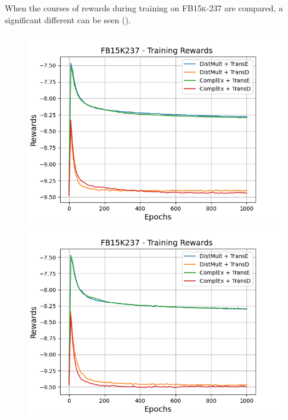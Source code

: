 When the courses of rewards during training on \textsc{FB15k-237} are compared, a significant different can be seen ().
\begin{figure}[H]
    \centering
    \begin{minipage}{.5\textwidth}
      \centering
      \includegraphics[width=0.9\linewidth]{figures/results/gan_train/not_pretrained/uncertainty/max_distribution/entropy/fb15k237/1k_epochs/uncertainty_fb15k237_rew.png}
    \end{minipage}%
    \begin{minipage}{.5\textwidth}
      \centering
      \includegraphics[width=0.9\linewidth]{figures/results/gan_train/not_pretrained/uncertainty/max_distribution/least_confidence/fb15k237/uncertainty_fb15k237_rew.png}
    \end{minipage}
    \begin{minipage}{.5\textwidth}

\end{minipage}
\end{figure}
